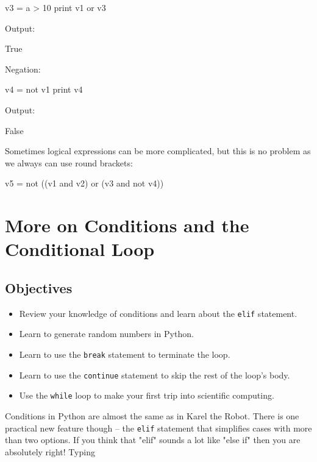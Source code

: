 \begin{bluecode}
v3 = a > 10
print v1 or v3
\end{bluecode}
Output:

\begin{bluecode}
True
\end{bluecode}
Negation:

\begin{bluecode}
v4 = not v1
print v4
\end{bluecode}
Output:

\begin{bluecode}
False
\end{bluecode}
Sometimes logical expressions can be more complicated, but this is no problem
as we always can use round brackets: 

\begin{bluecode}
v5 = not ((v1 and v2) or (v3 and not v4))
\end{bluecode}


\section{More on Conditions and the Conditional Loop} \label{sec:while}

\subsection{Objectives}

\begin{itemize}
\item Review your knowledge of conditions and learn about the {\tt elif} statement.
\item Learn to generate random numbers in Python.
\item Learn to use the {\tt break} statement to terminate the loop.
\item Learn to use the {\tt continue} statement to skip the rest of the loop's body.
\item Use the {\tt while} loop to make your first trip into scientific computing.
\end{itemize}
Conditions in Python are almost the same as in Karel the Robot. There is one practical 
new feature though -- the {\tt elif} statement that simplifies 
cases with more than two options. If you think that "elif" sounds a lot like "else if" then 
you are absolutely right! Typing 

